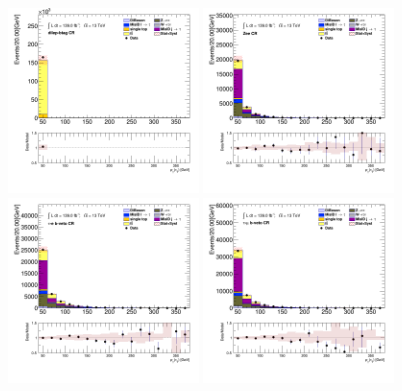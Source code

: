 		\begin{figure}[!htp]
			\begin{center}    
			\includegraphics[width=0.45\textwidth]{chapters/chapter6_HPlus/images/taulep/tau_0_pt_DILEP_BTAG.png}
			\includegraphics[width=0.45\textwidth]{chapters/chapter6_HPlus/images/taulep/tau_0_pt_ZEE.png} \\
			\includegraphics[width=0.45\textwidth]{chapters/chapter6_HPlus/images/taulep/tau_0_pt_TAUEL_BVETO.png} 
			\includegraphics[width=0.45\textwidth]{chapters/chapter6_HPlus/images/taulep/tau_0_pt_TAUMU_BVETO.png} \\

\end{center}
\end{figure}

